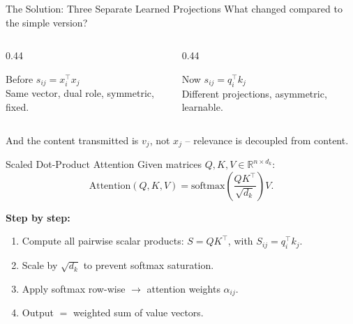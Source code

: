 \documentclass[aspectratio=169]{beamer}
\begin{document}
%
%
\begin{frame}{The Solution: Three Separate Learned Projections}
  What changed compared to the simple version?

  \vspace{0.5em}
  \begin{columns}[t]
    \begin{column}{0.44\textwidth}
      \begin{block}{Before}
        \centering\vspace{0.3em}
        $s_{ij} = x_i^\top x_j$\\[0.4em]
        {\small Same vector, dual role, symmetric, fixed.}
        \vspace{0.3em}
      \end{block}
    \end{column}
    \begin{column}{0.44\textwidth}
      \begin{block}{Now}
        \centering\vspace{0.3em}
        $s_{ij} = q_i^\top k_j$\\[0.4em]
        {\small Different projections, asymmetric, learnable.}
        \vspace{0.3em}
      \end{block}
    \end{column}
  \end{columns}

  \vspace{0.8em}
  And the content transmitted is $v_j$, not $x_j$ – relevance is decoupled from
  content.
\end{frame}
%
%
\begin{frame}{Scaled Dot-Product Attention}
  Given matrices $Q, K, V \in \mathbb{R}^{n \times d_k}$:
  \[
    \mathrm{Attention}(Q,K,V)
    = \mathrm{softmax}\!\left(\frac{QK^\top}{\sqrt{d_k}}\right)V.
  \]

      \textbf{Step by step:}
      \begin{enumerate}
        \item Compute all pairwise scalar products:
              $S = QK^\top$, with $S_{ij} = q_i^\top k_j$.
        \item Scale by $\sqrt{d_k}$ to prevent softmax saturation.
        \item Apply softmax row-wise $\to$ attention weights $\alpha_{ij}$.
        \item Output $=$ weighted sum of value vectors.
      \end{enumerate}
  \end{frame}
\end{document}
